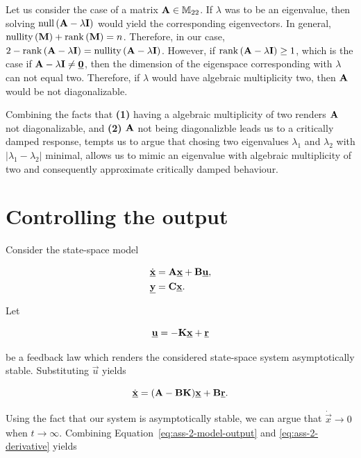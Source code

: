 \documentclass[11pt,titlepage]{report}
\begin{document}
Let us consider the case of a matrix $\mathbf{A} \in \mathbb{M}_{22}$. If $\lambda$ was to be an eigenvalue, then solving $\operatorname{null}{(\mathbf{A} - \lambda \mathbf{I})}$ would yield the corresponding eigenvectors. In general, $\operatorname{nullity}{(\mathbf{M})} + \operatorname{rank}{(\mathbf{M})} = n$. Therefore, in our case, $2 - \operatorname{rank}{(\mathbf{A} - \lambda \mathbf{I})} = \operatorname{nullity}{(\mathbf{A} - \lambda \mathbf{I})}$. However, if $\operatorname{rank}{(\mathbf{A} - \lambda \mathbf{I})} \ge 1$, which is the case if $\mathbf{A} - \lambda \mathbf{I} \neq \mathbf{\underline{0}}$, then the dimension of the eigenspace corresponding with $\lambda$ can not equal two. Therefore, if $\lambda$ would have algebraic multiplicity two, then $\mathbf{A}$ would be not diagonalizable.

Combining the facts that \textbf{(1)} having a algebraic multiplicity of two renders $\mathbf{A}$ not diagonalizable, and \textbf{(2)} $\mathbf{A}$ not being diagonalizble leads us to a critically damped response, tempts us to argue that chosing two eigenvalues $\lambda_1$ and $\lambda_2$ with $|\lambda_1- \lambda_2|$ minimal, allows us to mimic an eigenvalue with algebraic multiplicity of two and consequently approximate critically damped behaviour. 

\section{Controlling the output}
Consider the state-space model

\begin{align}
	\dot{\mathbf{\underline{x}}} &= \mathbf{A}\mathbf{\underline{x}} + \mathbf{B}\mathbf{\underline{u}}, \\
	\mathbf{\underline{y}} &= \mathbf{C} \mathbf{\underline{x}}. \label{eq:ass-2-model-output}
\end{align}

Let

\begin{equation}
	\mathbf{\underline{u}} = -\mathbf{K}\mathbf{\underline{x}} + \mathbf{\underline{r}}
\end{equation}

be a feedback law which renders the considered state-space system asymptotically stable. Substituting $\vec{u}$ yields

\begin{equation} \label{eq:ass-2-derivative}
	\dot{\mathbf{\underline{x}}} = (\mathbf{A} - \mathbf{B} \mathbf{K}) \mathbf{\underline{x}} + \mathbf{B} \mathbf{\underline{r}}.
\end{equation}

Using the fact that our system is asymptotically stable, we can argue that $\dot{\vec{x}} \to 0$ when $t \to \infty$. Combining Equation~\ref{eq:ass-2-model-output} and \ref{eq:ass-2-derivative} yields
\end{document}

